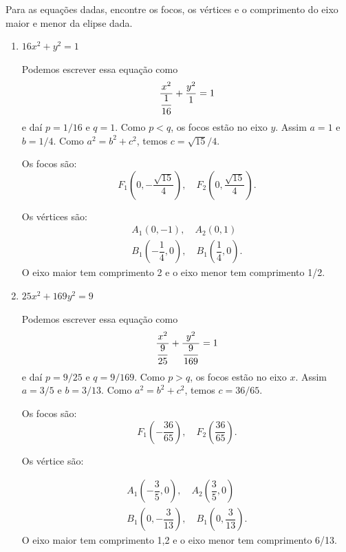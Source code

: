 \begin{exemplos}
    Para as equações dadas, encontre os focos, os vértices e o comprimento do eixo maior e menor da elipse dada.
    \begin{enumerate}
        \item $16x^2 + y^2 = 1$
              \begin{solucao}
                  Podemos escrever essa equação como
                  \[
                      \dfrac{x^2}{\dfrac{1}{16}} + \dfrac{y^2}{1} = 1
                  \]
                  e daí $p = 1/16$ e $q = 1$. Como $p < q$, os focos estão no eixo $y$. Assim $a = 1$ e $b = 1/4$. Como $a^2 = b^2 + c^2$, temos
                  $c = \sqrt{15}/4$.

                  Os focos são:
                  \[
                      F_1\left(0,-\dfrac{\sqrt{15}}{4}\right),\quad F_2\left(0,\dfrac{\sqrt{15}}{4}\right).
                  \]

                  Os vértices são:
                  \begin{align*}
                      A_1(0,-1),\quad A_2(0,1) \\
                      B_1\left(-\dfrac{1}{4},0\right),\quad B_1\left(\dfrac{1}{4},0\right).
                  \end{align*}
                  O eixo maior tem comprimento 2 e o eixo menor tem comprimento 1/2.
              \end{solucao}
        \item $25x^2 + 169y^2 = 9$
              \begin{solucao}
                  Podemos escrever essa equação como
                  \[
                      \dfrac{x^2}{\dfrac{9}{25}} + \dfrac{y^2}{\dfrac{9}{169}} = 1
                  \]
                  e daí $p = 9/25$ e $q = 9/169$. Como $p > q$, os focos estão no eixo $x$. Assim $a = 3/5$ e $b = 3/13$. Como $a^2 = b^2 + c^2$,
                  temos $c = 36/65$.

                  Os focos são:
                  \[
                      F_1\left(-\dfrac{36}{65}\right),\quad F_2\left(\dfrac{36}{65}\right).
                  \]

                  Os vértice são:

                  \begin{align*}
                      A_1\left(-\dfrac{3}{5},0\right),\quad A_2\left(\dfrac{3}{5},0\right) \\
                      B_1\left(0,-\dfrac{3}{13}\right),\quad B_1\left(0,\dfrac{3}{13}\right).
                  \end{align*}
                  O eixo maior tem comprimento 1,2 e o eixo menor tem comprimento 6/13.
              \end{solucao}
    \end{enumerate}
\end{exemplos}

